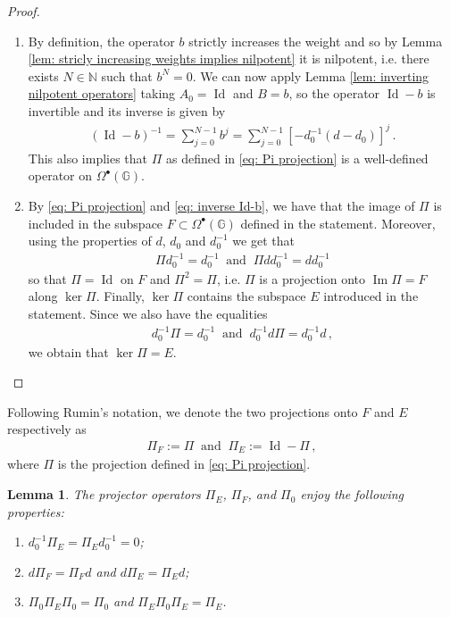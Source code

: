 \documentclass[dvipsnames]{amsart}
\newtheorem{lemma}[theorem]{Lemma}
\theoremstyle{definition}
\theoremstyle{definition}
\numberwithin{equation}{section}
\newcommand{\N}{\mathbb{N}}
\newcommand{\G}{\mathbb{G}}
\begin{document}
\begin{proof}$\phantom{=}$
    \begin{enumerate}
        \item By definition, the operator $b$ strictly increases the weight and so by Lemma \ref{lem: stricly increasing weights implies nilpotent} it is nilpotent, i.e. there exists $N\in\N$ such that $b^N=0$. We can now apply Lemma \ref{lem: inverting nilpotent operators} taking $A_0=\operatorname{Id}$ and $B=b$, so the operator $\operatorname{Id}-b$ is invertible and its inverse is given by
        \begin{align}\label{eq: inverse Id-b}
            \left(\operatorname{Id}-b\right)^{-1}=\sum_{j=0}^{N-1}b^j=\sum_{j=0}^{N-1}\left[-d_0^{-1}(d-d_0)\right]^j\,.
        \end{align}
        This also implies that $\Pi$ as defined in \eqref{eq: Pi projection} is a well-defined operator on $\Omega^\bullet(\G)$.
        \item  By \eqref{eq: Pi projection} and \eqref{eq: inverse Id-b}, we have that the image of $\Pi$ is included in the subspace $F\subset\Omega^\bullet(\G)$ defined in the statement. Moreover, using the properties of $d$, $d_0$ and $d_0^{-1}$ we get that
        \begin{align*}
            \Pi d_0^{-1}=d_0^{-1}\ \text{ and }\ \Pi dd_0^{-1}=dd_0^{-1}
        \end{align*}
        so that $\Pi=\operatorname{Id}$ on $F$ and $\Pi^2=\Pi$, i.e. $\Pi$ is a projection onto $\operatorname{Im}\Pi=F$ along $\ker\Pi$. Finally, $\ker\Pi$ contains the subspace $E$ introduced in the statement. Since we also have the equalities
        \begin{align*}
            d_0^{-1}\Pi=d_0^{-1}\ \text{ and }\ d_0^{-1}d\Pi=d_0^{-1}d\,,
        \end{align*}
        we obtain that $\ker\Pi=E$.
    \end{enumerate}
\end{proof}
Following Rumin's notation, we denote the two projections onto $F$ and $E$ respectively as
\begin{align*}
    \Pi_F:=\Pi\ \text{ and }\ \Pi_E:=\operatorname{Id}-\Pi\,,
\end{align*}
where $\Pi$ is the projection defined in \eqref{eq: Pi projection}.
\begin{lemma}\label{lem: properties of proejctions}
    The projector operators $\Pi_E$, $\Pi_F$, and $\Pi_0$ enjoy the following properties:
    \begin{enumerate}
        \item $d_0^{-1}\Pi_E=\Pi_Ed_0^{-1}=0$;
        \item $d\Pi_F=\Pi_Fd$ and $d\Pi_E=\Pi_Ed$;
        \item $\Pi_0\Pi_E\Pi_0=\Pi_0$ and $\Pi_E\Pi_0\Pi_E=\Pi_E$.
    \end{enumerate}
\end{lemma}
\end{document}
